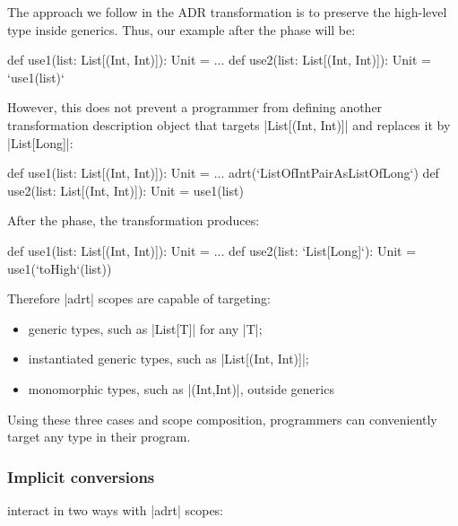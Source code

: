 The approach we follow in the ADR transformation is to preserve the high-level type inside generics. Thus, our example after the \commit{} phase will be:

\begin{lstlisting-nobreak}
def use1(list: List[(Int, Int)]): Unit = ...
def use2(list: List[(Int, Int)]): Unit = `use1(list)`
\end{lstlisting-nobreak}

However, this does not prevent a programmer from defining another transformation description object that targets |List[(Int, Int)]| and replaces it by |List[Long]|:

\begin{lstlisting-nobreak}
def use1(list: List[(Int, Int)]): Unit = ...
adrt(`ListOfIntPairAsListOfLong`) {
  def use2(list: List[(Int, Int)]): Unit = use1(list)
}
\end{lstlisting-nobreak}

After the \commit{} phase, the transformation produces:

\begin{lstlisting-nobreak}
def use1(list: List[(Int, Int)]): Unit = ...
def use2(list: `List[Long]`): Unit = use1(`toHigh`(list))
\end{lstlisting-nobreak}

Therefore |adrt| scopes are capable of targeting:
\begin{itemize}
\item generic types, such as |List[T]| for any |T|;
\item instantiated generic types, such as |List[(Int, Int)]|;
\item monomorphic types, such as |(Int,Int)|, outside generics
\end{itemize}

\noindent
Using these three cases and scope composition, programmers can conveniently target any type in their program.

\subsubsection{Implicit conversions}
\label{sec:ildl:language-implicit-conversions}
interact in two ways with |adrt| scopes:

